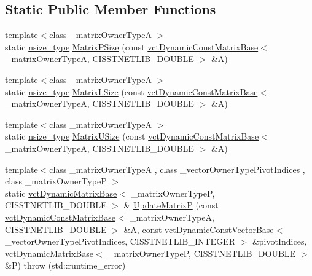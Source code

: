 \subsection*{Static Public Member Functions}
\begin{DoxyCompactItemize}
\item 
{\footnotesize template$<$class \+\_\+matrix\+Owner\+Type\+A $>$ }\\static \hyperlink{classnmr_l_u_dynamic_data_a5b722c87d1d635328893aa3f54ac35a1}{nsize\+\_\+type} \hyperlink{classnmr_l_u_dynamic_data_aa375c57067bf23d67ceca0f21af5a97e}{Matrix\+P\+Size} (const \hyperlink{classvct_dynamic_const_matrix_base}{vct\+Dynamic\+Const\+Matrix\+Base}$<$ \+\_\+matrix\+Owner\+Type\+A, C\+I\+S\+S\+T\+N\+E\+T\+L\+I\+B\+\_\+\+D\+O\+U\+B\+L\+E $>$ \&A)
\item 
{\footnotesize template$<$class \+\_\+matrix\+Owner\+Type\+A $>$ }\\static \hyperlink{classnmr_l_u_dynamic_data_a5b722c87d1d635328893aa3f54ac35a1}{nsize\+\_\+type} \hyperlink{classnmr_l_u_dynamic_data_acd1b9a9e749ea0a16d915d58d3a66b9e}{Matrix\+L\+Size} (const \hyperlink{classvct_dynamic_const_matrix_base}{vct\+Dynamic\+Const\+Matrix\+Base}$<$ \+\_\+matrix\+Owner\+Type\+A, C\+I\+S\+S\+T\+N\+E\+T\+L\+I\+B\+\_\+\+D\+O\+U\+B\+L\+E $>$ \&A)
\item 
{\footnotesize template$<$class \+\_\+matrix\+Owner\+Type\+A $>$ }\\static \hyperlink{classnmr_l_u_dynamic_data_a5b722c87d1d635328893aa3f54ac35a1}{nsize\+\_\+type} \hyperlink{classnmr_l_u_dynamic_data_a984c89b52c9455907020f029577a55f5}{Matrix\+U\+Size} (const \hyperlink{classvct_dynamic_const_matrix_base}{vct\+Dynamic\+Const\+Matrix\+Base}$<$ \+\_\+matrix\+Owner\+Type\+A, C\+I\+S\+S\+T\+N\+E\+T\+L\+I\+B\+\_\+\+D\+O\+U\+B\+L\+E $>$ \&A)
\item 
{\footnotesize template$<$class \+\_\+matrix\+Owner\+Type\+A , class \+\_\+vector\+Owner\+Type\+Pivot\+Indices , class \+\_\+matrix\+Owner\+Type\+P $>$ }\\static \hyperlink{classvct_dynamic_matrix_base}{vct\+Dynamic\+Matrix\+Base}$<$ \+\_\+matrix\+Owner\+Type\+P, C\+I\+S\+S\+T\+N\+E\+T\+L\+I\+B\+\_\+\+D\+O\+U\+B\+L\+E $>$ \& \hyperlink{classnmr_l_u_dynamic_data_ae8264b9afe51a6dc9062a28e76e76dd8}{Update\+Matrix\+P} (const \hyperlink{classvct_dynamic_const_matrix_base}{vct\+Dynamic\+Const\+Matrix\+Base}$<$ \+\_\+matrix\+Owner\+Type\+A, C\+I\+S\+S\+T\+N\+E\+T\+L\+I\+B\+\_\+\+D\+O\+U\+B\+L\+E $>$ \&A, const \hyperlink{classvct_dynamic_const_vector_base}{vct\+Dynamic\+Const\+Vector\+Base}$<$ \+\_\+vector\+Owner\+Type\+Pivot\+Indices, C\+I\+S\+S\+T\+N\+E\+T\+L\+I\+B\+\_\+\+I\+N\+T\+E\+G\+E\+R $>$ \&pivot\+Indices, \hyperlink{classvct_dynamic_matrix_base}{vct\+Dynamic\+Matrix\+Base}$<$ \+\_\+matrix\+Owner\+Type\+P, C\+I\+S\+S\+T\+N\+E\+T\+L\+I\+B\+\_\+\+D\+O\+U\+B\+L\+E $>$ \&P)  throw (std\+::runtime\+\_\+error)

\end{DoxyCompactItemize}
